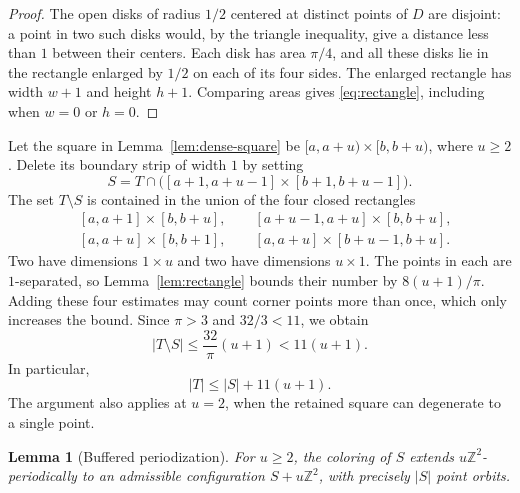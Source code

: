 \documentclass[11pt,a4paper]{article}
\newtheorem{lemma}[theorem]{Lemma}
\theoremstyle{definition}
\theoremstyle{remark}
\newcommand{\Z}{\mathbb{Z}}
\begin{document}
\begin{proof}
The open disks of radius $1/2$ centered at distinct points of $D$ are
disjoint: a point in two such disks would, by the triangle inequality,
give a distance less than $1$ between their centers. Each disk has area
$\pi/4$, and all these disks lie in the rectangle enlarged by $1/2$
on each of its four sides. The enlarged rectangle has width $w+1$ and
height $h+1$. Comparing areas gives \eqref{eq:rectangle}, including when
$w=0$ or $h=0$.
\end{proof}

Let the square in Lemma~\ref{lem:dense-square} be
$[a,a+u)\times[b,b+u)$, where $u\geq2$. Delete its boundary strip of
width $1$ by setting
\begin{equation}
\label{eq:interior-patch}
S=T\cap\bigl([a+1,a+u-1]\times[b+1,b+u-1]\bigr).
\end{equation}
The set $T\setminus S$ is contained in the union of the four closed
rectangles
\[
\begin{split}
&[a,a+1]\times[b,b+u],\qquad
 [a+u-1,a+u]\times[b,b+u],\\
&[a,a+u]\times[b,b+1],\qquad
 [a,a+u]\times[b+u-1,b+u].
\end{split}
\]
Two have dimensions $1\times u$ and two have dimensions $u\times1$.
The points in each are $1$-separated, so Lemma~\ref{lem:rectangle}
bounds their number by $8(u+1)/\pi$. Adding these four estimates may
count corner points more than once, which only increases the bound.
Since $\pi>3$ and $32/3<11$, we obtain
\[
|T\setminus S|\leq\frac{32}{\pi}(u+1)<11(u+1).
\]
In particular,
\begin{equation}
\label{eq:boundary-loss}
|T|\leq |S|+11(u+1).
\end{equation}
The argument also applies at $u=2$, when the retained square can
degenerate to a single point.

\begin{lemma}[Buffered periodization]
\label{lem:periodization}
For $u\geq2$, the coloring of $S$ extends $u\Z^2$-periodically to an
admissible configuration $S+u\Z^2$, with precisely $|S|$ point orbits.
\end{lemma}
\end{document}
